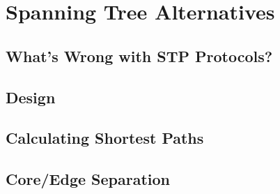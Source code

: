 
\chapter{Spanning Tree Alternatives}
 \label{spanning_tree}

\section{What's Wrong with STP Protocols?}
 \label{spanning_tree:whats_wrong}

\section{Design}

\section{Calculating Shortest Paths}

\section{Core/Edge Separation}


